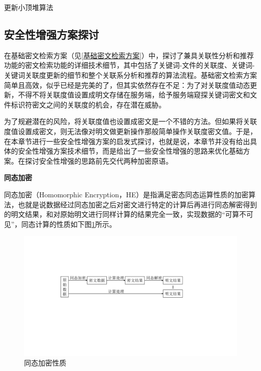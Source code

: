 \documentclass[promaster]{thesis-uestc}
\begin{document}
\begin{algorithm}[H]
    \caption{更新小顶堆算法}
    \label{更新小顶堆算法}
\end{algorithm}

\subsection{安全性增强方案探讨}\label{安全性增强方案}
在基础密文检索方案（见\ref{基础密文检索方案}）中，探讨了兼具关联性分析和推荐功能的密文检索功能的详细技术细节，其中包括了关键词-文件的关联度、关键词-关键词关联度更新的细节和整个关联系分析和推荐的算法流程。基础密文检索方案简单且高效，似乎已经是完美的了，但其实依然存在不足：为了对关联度值动态更新，不得不将关联度值设置成明文存储在服务端，给予服务端窥探关键词密文和文件标识符密文之间的关联度的机会，存在潜在威胁。

为了规避潜在的风险，将关联度值也设置成密文是一个不错的方法。但如果将关联度值设置成密文，则无法像对明文做更新操作那般简单操作关联度密文值。于是，在本章节进行一些安全性增强方案的启发式探讨，也就是说，本章节并没有给出具体的安全性增强方案技术细节，而是给出了一些安全性增强的思路来优化基础方案。在探讨安全性增强的思路前先交代两种加密原语。

\textbf{同态加密}\label{同态加密}

同态加密（Homomorphic Encryption，HE）是指满足密态同态运算性质的加密算法，也就是说数据经过同态加密之后对密文进行特定的计算后再进行同态解密得到的明文结果，和对原始明文进行同样计算的结果完全一致，实现数据的“可算不可见”，同态计算的性质如下图\ref{同态加密性质}所示。
\begin{figure}[htbp]
    \centering
    \includegraphics[width = 0.8\linewidth]{pic/同态加密性质.pdf}
    \caption{同态加密性质}
    \label{同态加密性质}
\end{figure}
\end{document}
